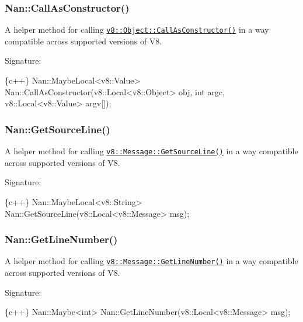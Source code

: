 \label{_api_nan_call_as_constructor}%
 \subsubsection*{Nan\+::\+Call\+As\+Constructor()}

A helper method for calling \href{https://v8docs.nodesource.com/io.js-3.0/db/d85/classv8_1_1_object.html#a50d571de50d0b0dfb28795619d07a01b}{\tt {\ttfamily v8\+::\+Object\+::\+Call\+As\+Constructor()}} in a way compatible across supported versions of V8.

Signature\+:


\begin{DoxyCode}
\{c++\}
Nan::MaybeLocal<v8::Value> Nan::CallAsConstructor(v8::Local<v8::Object> obj,
                                                  int argc,
                                                  v8::Local<v8::Value> argv[]);
\end{DoxyCode}


\label{_api_nan_get_source_line}%
 \subsubsection*{Nan\+::\+Get\+Source\+Line()}

A helper method for calling \href{https://v8docs.nodesource.com/io.js-3.0/d9/d28/classv8_1_1_message.html#a849f7a6c41549d83d8159825efccd23a}{\tt {\ttfamily v8\+::\+Message\+::\+Get\+Source\+Line()}} in a way compatible across supported versions of V8.

Signature\+:


\begin{DoxyCode}
\{c++\}
Nan::MaybeLocal<v8::String> Nan::GetSourceLine(v8::Local<v8::Message> msg);
\end{DoxyCode}


\label{_api_nan_get_line_number}%
 \subsubsection*{Nan\+::\+Get\+Line\+Number()}

A helper method for calling \href{https://v8docs.nodesource.com/io.js-3.0/d9/d28/classv8_1_1_message.html#adbe46c10a88a6565f2732a2d2adf99b9}{\tt {\ttfamily v8\+::\+Message\+::\+Get\+Line\+Number()}} in a way compatible across supported versions of V8.

Signature\+:


\begin{DoxyCode}
\{c++\}
Nan::Maybe<int> Nan::GetLineNumber(v8::Local<v8::Message> msg);
\end{DoxyCode}


